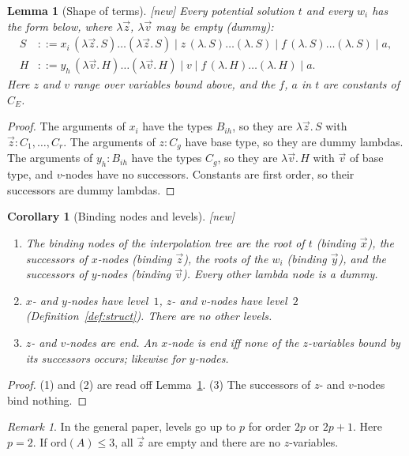 \documentclass[11pt]{article}
\newcommand{\ord}{\mathrm{ord}}
\newcommand{\CE}{C_E}
\newcommand{\New}{\textsf{[new]}}
\theoremstyle{plain}
\newtheorem{lemma}[theorem]{Lemma}
\newtheorem{corollary}[theorem]{Corollary}
\theoremstyle{definition}
\theoremstyle{remark}
\newtheorem{remark}[theorem]{Remark}
\begin{document}
\begin{lemma}[Shape of terms]\label{lem:shape}
\New{} Every potential solution $t$ and every $w_i$ has the form below,
where $\lambda\vec z$, $\lambda\vec v$ may be empty (dummy):
\begin{align*}
S&::=x_i\,(\lambda\vec z.\,S)\dots(\lambda\vec z.\,S)\mid
     z\,(\lambda.\,S)\dots(\lambda.\,S)\mid f\,(\lambda.\,S)\dots(\lambda.\,S)\mid a,\\
H&::=y_h\,(\lambda\vec v.\,H)\dots(\lambda\vec v.\,H)\mid v\mid
     f\,(\lambda.\,H)\dots(\lambda.\,H)\mid a .
\end{align*}
Here $z$ and $v$ range over variables bound above, and the $f$, $a$ in
$t$ are constants of $\CE$.
\end{lemma}
\begin{proof}
The arguments of $x_i$ have the types $B_{ih}$, so they are
$\lambda\vec z.\,S$ with $\vec z:C_1,\dots,C_r$.  The arguments of
$z:C_g$ have base type, so they are dummy lambdas.  The arguments of
$y_h:B_{ih}$ have the types $C_g$, so they are $\lambda\vec v.\,H$ with
$\vec v$ of base type, and $v$-nodes have no successors.  Constants are
first order, so their successors are dummy lambdas.
\end{proof}

\begin{corollary}[Binding nodes and levels]\label{cor:binders}
\New{}
\begin{enumerate}
\item The binding nodes of the interpolation tree are the root of $t$
  (binding $\vec x$), the successors of $x$-nodes (binding $\vec z$),
  the roots of the $w_i$ (binding $\vec y$), and the successors of
  $y$-nodes (binding $\vec v$).  Every other lambda node is a dummy.
\item $x$- and $y$-nodes have level~$1$, $z$- and $v$-nodes have
  level~$2$ (Definition~\ref{def:struct}).  There are no other levels.
\item $z$- and $v$-nodes are end.  An $x$-node is end iff none of the
  $z$-variables bound by its successors occurs; likewise for
  $y$-nodes.
\end{enumerate}
\end{corollary}
\begin{proof}
(1) and (2) are read off Lemma~\ref{lem:shape}.  (3) The successors of
$z$- and $v$-nodes bind nothing.
\end{proof}

\begin{remark}
In the general paper, levels go up to $p$ for order $2p$ or $2p+1$.
Here $p=2$.  If $\ord(A)\le3$, all $\vec z$ are empty and there are no
$z$-variables.
\end{remark}
\end{document}
